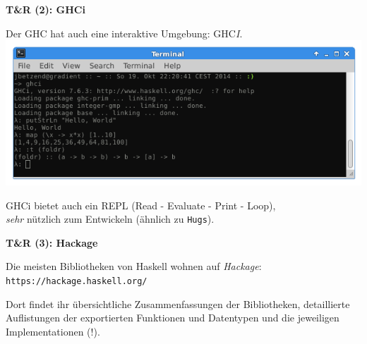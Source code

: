 \documentclass[unknownkeysallowed]{beamer}
\begin{document}
  \begin{frame}
    \Large\textbf{T\&R (2): GHCi}\bigskip \normalsize
    
    Der GHC hat auch eine interaktive Umgebung: GHC\emph{I}.\\\bigskip
    \includegraphics[scale=0.4]{ghci_example.png} 
    
    \bigskip GHCi bietet auch ein REPL (Read - Evaluate - Print - Loop),\\\emph{sehr} nützlich zum Entwickeln (ähnlich zu \texttt{Hugs}).
  \end{frame}
  
  
  \begin{frame}
    \Large\textbf{T\&R (3): Hackage}\bigskip \normalsize
    
    Die meisten Bibliotheken von Haskell wohnen auf \emph{Hackage}: \\ \bigskip \texttt{https://hackage.haskell.org/}
    
    Dort findet ihr übersichtliche Zusammenfassungen der Bibliotheken, detaillierte Auflistungen der exportierten Funktionen und Datentypen und die jeweiligen Implementationen (!).
  \end{frame}
  
  
\end{document}
